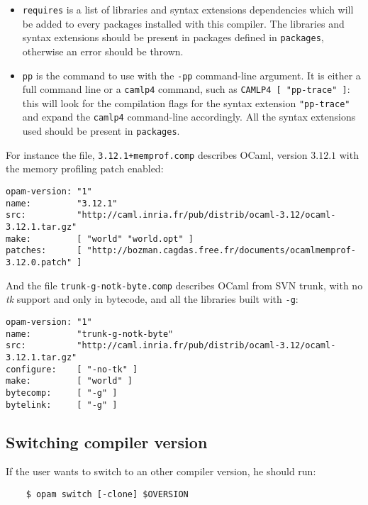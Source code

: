\documentclass[a4paper,11pt]{article}
\begin{document}
\begin{itemize}
\item {\tt requires} is a list of libraries and syntax extensions
  dependencies which will be added to every packages installed with
  this compiler. The libraries and syntax extensions should be present
  in packages defined in {\tt packages}, otherwise an error should be
  thrown.

\item {\tt pp} is the command to use with the {\tt -pp} command-line
  argument. It is either a full command line or a {\tt camlp4} command,
  such as \verb+CAMLP4 [ "pp-trace" ]+: this will look for the
  compilation flags for the syntax extension \verb+"pp-trace"+ and expand
  the {\tt camlp4} command-line accordingly. All the syntax extensions used
  should be present in {\tt packages}.

\end{itemize}

For instance the file, {\tt 3.12.1+memprof.comp} describes OCaml,
version $3.12.1$ with the memory profiling patch enabled:

\begin{verbatim}
opam-version: "1"
name:         "3.12.1" 
src:          "http://caml.inria.fr/pub/distrib/ocaml-3.12/ocaml-3.12.1.tar.gz"
make:         [ "world" "world.opt" ]
patches:      [ "http://bozman.cagdas.free.fr/documents/ocamlmemprof-3.12.0.patch" ]
\end{verbatim}

And the file {\tt trunk-g-notk-byte.comp} describes OCaml from SVN
trunk, with no {\em tk} support and only in bytecode, and all the
libraries built with {\tt -g}:

\begin{verbatim}
opam-version: "1"
name:         "trunk-g-notk-byte"
src:          "http://caml.inria.fr/pub/distrib/ocaml-3.12/ocaml-3.12.1.tar.gz"
configure:    [ "-no-tk" ]
make:         [ "world" ]
bytecomp:     [ "-g" ]
bytelink:     [ "-g" ]
\end{verbatim}

\subsection{Switching compiler version}

If the user wants to switch to an other compiler version, he should run:

\begin{verbatim}
    $ opam switch [-clone] $OVERSION
\end{verbatim}
\end{document}
